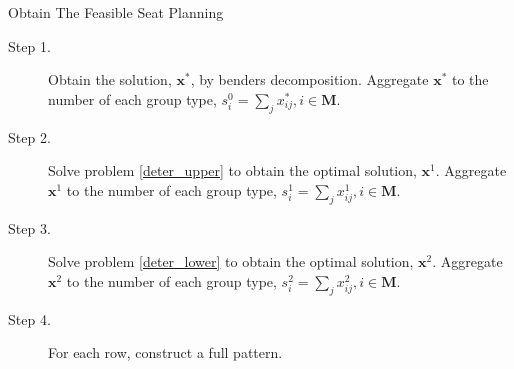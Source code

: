\begin{frame}{Obtain The Feasible Seat Planning}
      \begin{description}
        \item[Step 1.] Obtain the solution, $\mathbf{x}^{*}$, by benders decomposition. Aggregate $\mathbf{x}^{*}$ to the number of each group type, ${s}_{i}^{0} =\sum_{j} x^{*}_{ij}, i \in \mathbf{M}$.

        \item[Step 2.] Solve problem \eqref{deter_upper} to obtain the optimal solution, $\mathbf{x}^{1}$. Aggregate $\mathbf{x}^{1}$ to the number of each group type, ${s}_{i}^{1} = \sum_{j} x^{1}_{ij}, i \in \mathbf{M}$.
        
        \item[Step 3.] Solve problem \eqref{deter_lower} to obtain the optimal solution, $\mathbf{x}^{2}$. Aggregate $\mathbf{x}^{2}$ to the number of each group type, ${s}_{i}^{2} = \sum_{j} x^{2}_{ij}, i \in \mathbf{M}$.
    
        \item[Step 4.] For each row, construct a full pattern.
     \end{description}
\end{frame}